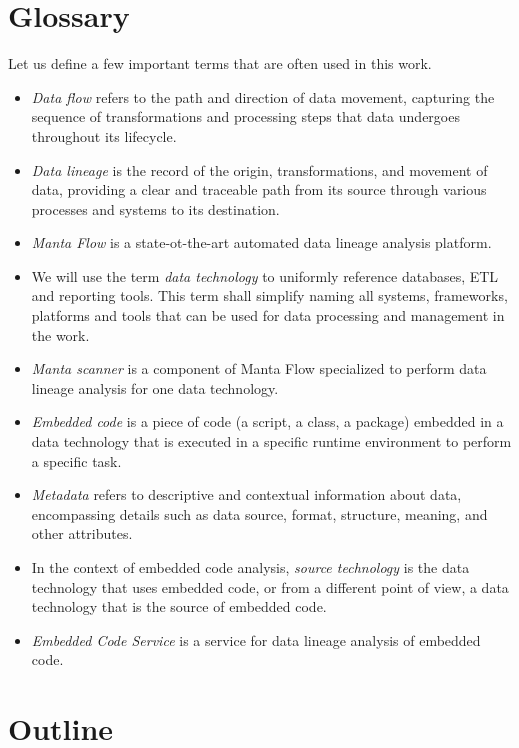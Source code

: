 \section{Glossary}

Let us define a few important terms that are often used in this work.
\begin{itemize}
    \item \textit{Data flow} refers to the path and direction of data movement, capturing the sequence of transformations and processing steps that data undergoes throughout its lifecycle.
    \item \textit{Data lineage} is the record of the origin, transformations, and movement of data, providing a clear and traceable path from its source through various processes and systems to its destination.
    \item \textit{Manta Flow} is a state-ot-the-art automated data lineage analysis platform.
    \item We will use the term \textit{data technology} to uniformly reference databases, ETL and reporting tools. This term shall simplify naming all systems, frameworks, platforms and tools that can be used for data processing and management in the work.    
    \item \textit{Manta scanner} is a component of Manta Flow specialized to perform data lineage analysis for one data technology.
    \item \textit{Embedded code} is a piece of code (a script, a class, a package) embedded in a data technology that is executed in a specific runtime environment to perform a specific task.
    \item \textit{Metadata} refers to descriptive and contextual information about data, encompassing details such as data source, format, structure, meaning, and other attributes.
    \item In the context of embedded code analysis, \textit{source technology} is the data technology that uses embedded code, or from a different point of view, a data technology that is the source of embedded code.
    \item \textit{Embedded Code Service} is a service for data lineage analysis of embedded code.
\end{itemize}

\section{Outline}

